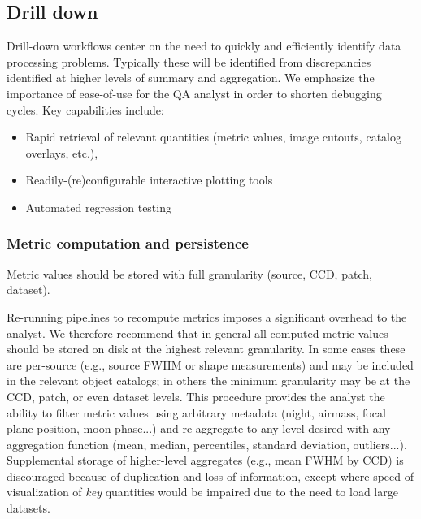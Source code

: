 
\subsection{Drill down} \label{sec:drill-down-design}


Drill-down workflows center on the need to quickly and efficiently identify data processing problems.
Typically these will be identified from discrepancies identified at higher levels of summary and aggregation.
We emphasize the importance of ease-of-use for the QA analyst in order to shorten debugging cycles.
Key capabilities include:

\begin{itemize}
	\item Rapid retrieval of relevant quantities (metric values, image cutouts, catalog overlays, etc.),
	\item Readily-(re)configurable interactive plotting tools
	\item Automated regression testing
\end{itemize}

\subsubsection{Metric computation and persistence} \label{sec:metric_storage}

\begin{recommendation}
Metric values should be stored with full granularity (source, CCD, patch, dataset).
\end{recommendation}

Re-running pipelines to recompute metrics imposes a significant overhead to the analyst.
We therefore recommend that in general all computed metric values should be stored on disk at the highest relevant granularity.
In some cases these are per-source (e.g., source FWHM or shape measurements) and may be included in the relevant object catalogs; in others the minimum granularity may be at the CCD, patch, or even dataset levels.
This procedure provides the analyst the ability to filter metric values using arbitrary metadata (night, airmass, focal plane position, moon phase...) and re-aggregate to any level desired with any aggregation function (mean, median, percentiles, standard deviation, outliers...).
Supplemental storage of higher-level aggregates (e.g., mean FWHM by CCD) is discouraged because of duplication and loss of information, except where speed of visualization of \emph{key} quantities would be impaired due to the need to load large datasets.



